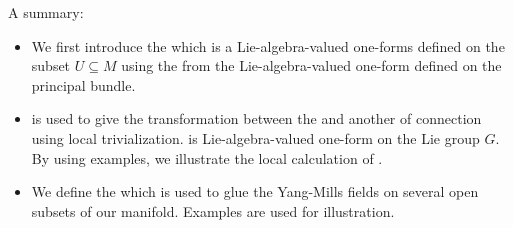 \documentclass{article}
\begin{document}
A summary:
\begin{itemize}[$\blacktriangleright$]
\item We first introduce the  which is a Lie-algebra-valued one-forms  defined on the subset $U\subseteq M$ using the  from the  Lie-algebra-valued one-form defined on the principal bundle. 
\bse
{}
\ese
\item  {} is used to give the transformation between the  and another  of connection using local trivialization.  is Lie-algebra-valued one-form on the Lie group $G$. By using examples, we illustrate the local calculation of .

\item We define the  which is used to glue the Yang-Mills fields on several open subsets of our manifold. Examples are used for illustration.
\end{itemize}
\end{document}
